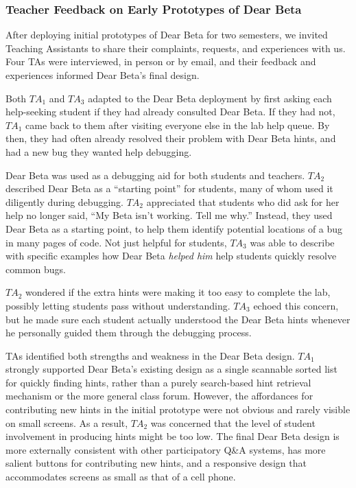 \subsubsection{Teacher Feedback on Early Prototypes of Dear Beta}


After deploying initial prototypes of Dear Beta for two semesters, we invited Teaching Assistants to share their complaints, requests, and experiences with us. Four TAs were interviewed, in person or by email, and their feedback and experiences informed Dear Beta's final design.

Both $TA_{1}$ and $TA_{3}$ adapted to the Dear Beta deployment by first asking each help-seeking student if they had already consulted Dear Beta. If they had not, $TA_{1}$ came back to them after visiting everyone else in the lab help queue. By then, they had often already resolved their problem with Dear Beta hints, and had a new bug they wanted help debugging. 

Dear Beta was used as a debugging aid for both students and teachers. $TA_{2}$ described Dear Beta as a ``starting point'' for students, many of whom used it diligently during debugging. $TA_{2}$ appreciated that students who did ask for her help no longer said, ``My Beta isn't working. Tell me why.'' Instead, they used Dear Beta as a starting point, to help them identify potential locations of a bug in many pages of code. Not just helpful for students, $TA_{3}$ was able to describe with specific examples how Dear Beta \textit{helped him} help students quickly resolve common bugs.

$TA_{2}$ wondered if the extra hints were making it too easy to complete the lab, possibly letting students pass without understanding. $TA_{3}$ echoed this concern, but he made sure each student actually understood the Dear Beta hints whenever he personally guided them through the debugging process.

TAs identified both strengths and weakness in the Dear Beta design. $TA_{1}$ strongly supported Dear Beta's existing design as a single scannable sorted list for quickly finding hints, rather than a purely search-based hint retrieval mechanism or the more general class forum. However, the affordances for contributing new hints in the initial prototype were not obvious and rarely visible on small screens. As a result, $TA_{2}$ was concerned that the level of student involvement in producing hints might be too low. The final Dear Beta design is more externally consistent with other participatory Q\&A systems, has more salient buttons for contributing new hints, and a responsive design that accommodates screens as small as that of a cell phone. 

